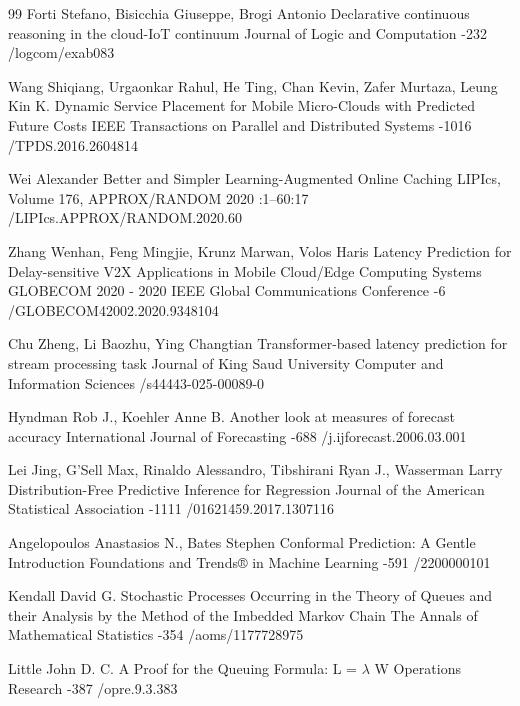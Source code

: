 \begin{thebibliography}{99}
\by Forti Stefano, Bisicchia Giuseppe, Brogi Antonio
\paper Declarative continuous reasoning in the cloud-IoT continuum
\jour Journal of Logic and Computation
-232
/logcom/exab083

\by Wang Shiqiang, Urgaonkar Rahul, He Ting, Chan Kevin, Zafer Murtaza, Leung Kin K.
\paper Dynamic Service Placement for Mobile Micro-Clouds with Predicted Future Costs
\jour IEEE Transactions on Parallel and Distributed Systems
-1016
/TPDS.2016.2604814

\by Wei Alexander
\paper Better and Simpler Learning-Augmented Online Caching
\jour LIPIcs, Volume 176, APPROX/RANDOM 2020
:1--60:17
/LIPIcs.APPROX/RANDOM.2020.60

\by Zhang Wenhan, Feng Mingjie, Krunz Marwan, Volos Haris
\paper Latency Prediction for Delay-sensitive V2X Applications in Mobile Cloud/Edge Computing Systems
\jour GLOBECOM 2020 - 2020 IEEE Global Communications Conference
-6
/GLOBECOM42002.2020.9348104

\by Chu Zheng, Li Baozhu, Ying Changtian
\paper Transformer-based latency prediction for stream processing task
\jour Journal of King Saud University Computer and Information Sciences
/s44443-025-00089-0

\by Hyndman Rob J., Koehler Anne B.
\paper Another look at measures of forecast accuracy
\jour International Journal of Forecasting
-688
/j.ijforecast.2006.03.001

\by Lei Jing, G’Sell Max, Rinaldo Alessandro, Tibshirani Ryan J., Wasserman Larry
\paper Distribution-Free Predictive Inference for Regression
\jour Journal of the American Statistical Association
-1111
/01621459.2017.1307116

\by Angelopoulos Anastasios N., Bates Stephen
\paper Conformal Prediction: A Gentle Introduction
\jour Foundations and Trends® in Machine Learning
-591
/2200000101

\by Kendall David G.
\paper Stochastic Processes Occurring in the Theory of Queues and their Analysis by the Method of the Imbedded Markov Chain
\jour The Annals of Mathematical Statistics
-354
/aoms/1177728975

\by Little John D. C.
\paper A Proof for the Queuing Formula:
                    L
                    = $\lambda$
                    W
\jour Operations Research
-387
/opre.9.3.383

\end{thebibliography}
